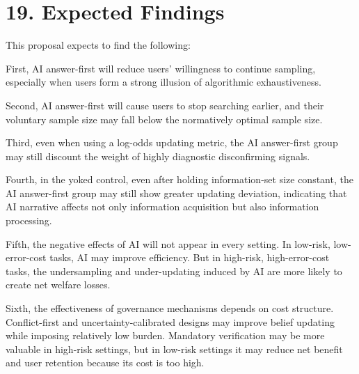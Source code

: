 \section*{19. Expected Findings}

This proposal expects to find the following:

First, AI answer-first will reduce users' willingness to continue sampling, especially when users form a strong illusion of algorithmic exhaustiveness.

Second, AI answer-first will cause users to stop searching earlier, and their voluntary sample size may fall below the normatively optimal sample size.

Third, even when using a log-odds updating metric, the AI answer-first group may still discount the weight of highly diagnostic disconfirming signals.

Fourth, in the yoked control, even after holding information-set size constant, the AI answer-first group may still show greater updating deviation, indicating that AI narrative affects not only information acquisition but also information processing.

Fifth, the negative effects of AI will not appear in every setting. In low-risk, low-error-cost tasks, AI may improve efficiency. But in high-risk, high-error-cost tasks, the undersampling and under-updating induced by AI are more likely to create net welfare losses.

Sixth, the effectiveness of governance mechanisms depends on cost structure. Conflict-first and uncertainty-calibrated designs may improve belief updating while imposing relatively low burden. Mandatory verification may be more valuable in high-risk settings, but in low-risk settings it may reduce net benefit and user retention because its cost is too high.
